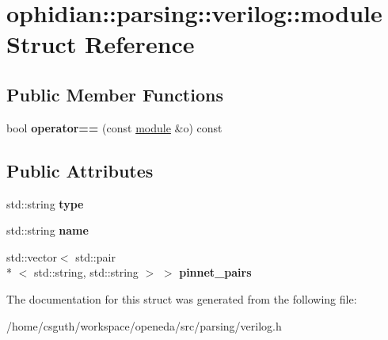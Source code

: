 \hypertarget{structophidian_1_1parsing_1_1verilog_1_1module}{\section{ophidian\-:\-:parsing\-:\-:verilog\-:\-:module Struct Reference}
\label{structophidian_1_1parsing_1_1verilog_1_1module}
}
\subsection*{Public Member Functions}
\begin{DoxyCompactItemize}
\item 
\hypertarget{structophidian_1_1parsing_1_1verilog_1_1module_af81ea27cbf27b28add7db7411a364eaa}{bool {\bfseries operator==} (const \hyperlink{structophidian_1_1parsing_1_1verilog_1_1module}{module} \&o) const }\label{structophidian_1_1parsing_1_1verilog_1_1module_af81ea27cbf27b28add7db7411a364eaa}

\end{DoxyCompactItemize}
\subsection*{Public Attributes}
\begin{DoxyCompactItemize}
\item 
\hypertarget{structophidian_1_1parsing_1_1verilog_1_1module_a372847ffb321e358e7eb3c92905d3b4a}{std\-::string {\bfseries type}}\label{structophidian_1_1parsing_1_1verilog_1_1module_a372847ffb321e358e7eb3c92905d3b4a}

\item 
\hypertarget{structophidian_1_1parsing_1_1verilog_1_1module_a78d08b6faa53e9d1fa60066558fb2a76}{std\-::string {\bfseries name}}\label{structophidian_1_1parsing_1_1verilog_1_1module_a78d08b6faa53e9d1fa60066558fb2a76}

\item 
\hypertarget{structophidian_1_1parsing_1_1verilog_1_1module_acd0cfcadfcac03e90a36b91f7b3fa1a5}{std\-::vector$<$ std\-::pair\\*
$<$ std\-::string, std\-::string $>$ $>$ {\bfseries pinnet\-\_\-pairs}}\label{structophidian_1_1parsing_1_1verilog_1_1module_acd0cfcadfcac03e90a36b91f7b3fa1a5}

\end{DoxyCompactItemize}


The documentation for this struct was generated from the following file\-:\begin{DoxyCompactItemize}
\item 
/home/csguth/workspace/openeda/src/parsing/verilog.\-h\end{DoxyCompactItemize}
